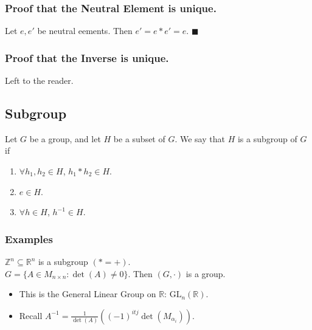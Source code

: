 \documentclass[11pt]{article}
\newcommand{\0}{\emptyset}
\newcommand{\Z}{\mathbb{Z}}
\newcommand{\R}{\mathbb{R}}
\begin{document}
\subsubsection*{Proof that the Neutral Element is unique.}
\label{sec:org369348f}
Let \(e,e'\) be neutral eements. Then \(e'=e*e'=e\). \(\blacksquare\)\\[0pt]
\subsubsection*{Proof that the Inverse is unique.}
\label{sec:org4c735dc}
Left to the reader.\\[0pt]
\subsection*{Subgroup}
\label{sec:orgd102405}
Let \(G\) be a group, and let \(H\) be a subset of \(G\). We say that \(H\) is a subgroup of \(G\) if\\[0pt]
\begin{enumerate}
\item \(\forall h_{1},h_{2}\in H\), \(h_{1}*h_{2}\in H\).\\[0pt]
\item \(e\in H\).\\[0pt]
\item \(\forall h\in H\), \(h^{-1}\in H\).\\[0pt]
\end{enumerate}
\subsubsection*{Examples}
\label{sec:org03b0db0}
\(\Z^{n}\subseteq \R^{n}\) is a subgroup \((*=+)\).\\[0pt]
\(G=\{A\in M_{n\times n}:\det(A)\neq 0\}\). Then \((G,\cdot)\) is a group.\\[0pt]
\begin{itemize}
\item This is the General Linear Group on \(\R\): \(\text{GL}_{n}(\R)\).\\[0pt]
\item Recall \(A^{-1}=\frac{1}{\det(A)}\left( (-1)^{itj}\det(M_{\alpha_{i}}) \right)\).\\[0pt]
\end{itemize}
\end{document}
